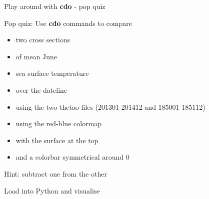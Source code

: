 \begin{frame}{\insertsectionnumber{ |} Play around with \textbf{cdo} - pop quiz}
    \begin{beamerboxesrounded}[lower=gray,shadow=true]{Pop quiz: Use \textbf{cdo} commands to compare 
        \begin{itemize}
            \item two cross sections
                \vspace{0.15cm}
            \item of mean June
                \vspace{0.15cm}
            \item sea surface temperature
                \vspace{0.15cm}
            \item over the dateline
            \vspace{0.3cm}
            \item using the two thetao files (201301-201412 and 185001-185112)
                \vspace{0.15cm}
            \item using the red-blue colormap
                \vspace{0.15cm}
            \item with the surface at the top 
                \vspace{0.15cm}
            \item and a colorbar symmetrical around 0
        \end{itemize}
            \vspace{1.5cm}
        Hint: subtract one from the other}
    \end{beamerboxesrounded}
\end{frame}


\begin{frame}{\insertsectionnumber{ |} Load into Python and visualise}
\end{frame} 


